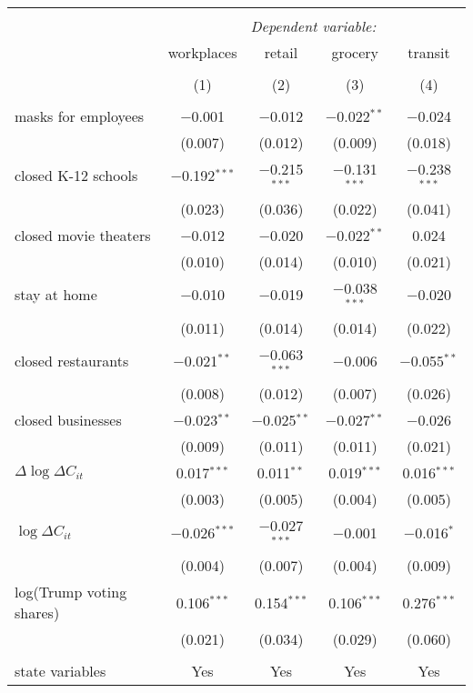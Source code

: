\begin{tabular}{@{\extracolsep{1pt}}lcccc} 
\\[-1.8ex]\hline 
\hline \\[-1.8ex] 
 & \multicolumn{4}{c}{\textit{Dependent variable:}} \\ 
\cline{2-5} 
 & workplaces & retail & grocery & transit \\ 
\\[-1.8ex] & (1) & (2) & (3) & (4)\\ 
\hline \\[-1.8ex] 
 masks for employees & $-$0.001 & $-$0.012 & $-$0.022$^{**}$ & $-$0.024 \\ 
  & (0.007) & (0.012) & (0.009) & (0.018) \\ 
  closed K-12 schools & $-$0.192$^{***}$ & $-$0.215$^{***}$ & $-$0.131$^{***}$ & $-$0.238$^{***}$ \\ 
  & (0.023) & (0.036) & (0.022) & (0.041) \\ 
  closed movie theaters & $-$0.012 & $-$0.020 & $-$0.022$^{**}$ & 0.024 \\ 
  & (0.010) & (0.014) & (0.010) & (0.021) \\ 
  stay at home & $-$0.010 & $-$0.019 & $-$0.038$^{***}$ & $-$0.020 \\ 
  & (0.011) & (0.014) & (0.014) & (0.022) \\ 
  closed restaurants & $-$0.021$^{**}$ & $-$0.063$^{***}$ & $-$0.006 & $-$0.055$^{**}$ \\ 
  & (0.008) & (0.012) & (0.007) & (0.026) \\ 
  closed businesses & $-$0.023$^{**}$ & $-$0.025$^{**}$ & $-$0.027$^{**}$ & $-$0.026 \\ 
  & (0.009) & (0.011) & (0.011) & (0.021) \\ 
  $\Delta \log \Delta C_{it}$ & 0.017$^{***}$ & 0.011$^{**}$ & 0.019$^{***}$ & 0.016$^{***}$ \\ 
  & (0.003) & (0.005) & (0.004) & (0.005) \\ 
  $\log \Delta C_{it}$ & $-$0.026$^{***}$ & $-$0.027$^{***}$ & $-$0.001 & $-$0.016$^{*}$ \\ 
  & (0.004) & (0.007) & (0.004) & (0.009) \\ 
  log(Trump voting shares) & 0.106$^{***}$ & 0.154$^{***}$ & 0.106$^{***}$ & 0.276$^{***}$ \\ 
  & (0.021) & (0.034) & (0.029) & (0.060) \\ 
 \hline \\[-1.8ex] 
state variables & Yes & Yes & Yes & Yes \\ 

\end{tabular}

